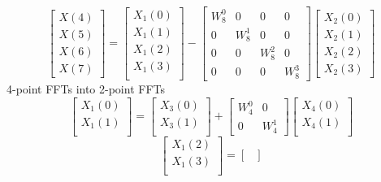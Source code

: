 \documentclass[journal,12pt,twocolumn]{IEEEtran}
\renewcommand\thesection{\arabic{section}}
\begin{document}
\begin{enumerate}[label=\arabic*.,ref=\thesection.\theenumi]
\begin{equation}
\end{equation}
\begin{equation}
\begin{bmatrix}
X(4) \\ 
X(5) \\ 
X(6) \\ 
X(7)
\end{bmatrix}
=
\begin{bmatrix}
X_{1}(0) \\ 
X_{1}(1)\\ 
X_{1}(2)\\
X_{1}(3)\\
\end{bmatrix}
-
\begin{bmatrix}
W^{0}_{8} & 0 & 0 & 0\\
0 & W^{1}_{8} & 0 & 0\\
0 & 0 & W^{2}_{8} & 0\\
0 & 0 & 0 & W^{3}_{8}
\end{bmatrix}
\begin{bmatrix}
X_{2}(0) \\ 
X_{2}(1) \\ 
X_{2}(2) \\
X_{2}(3)
\end{bmatrix}
\end{equation}
4-point FFTs into 2-point FFTs
\begin{equation}
\begin{bmatrix}
X_{1}(0) \\ 
X_{1}(1)\\ 
\end{bmatrix}
=
\begin{bmatrix}
X_{3}(0) \\ 
X_{3}(1)\\ 
\end{bmatrix}
+
\begin{bmatrix}
W^{0}_{4} & 0\\
0 & W^{1}_{4}
\end{bmatrix}
\begin{bmatrix}
X_{4}(0) \\ 
X_{4}(1) \\ 
\end{bmatrix}
\end{equation}
\begin{equation}
\begin{bmatrix}
X_{1}(2) \\ 
X_{1}(3)\\ 
\end{bmatrix}
=
\begin{bmatrix}

\end{bmatrix}
\end{equation}
\end{enumerate}
\end{document}
